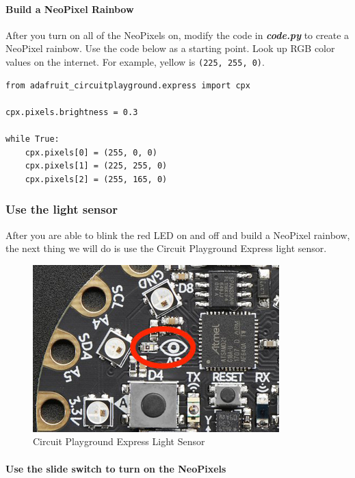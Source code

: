\documentclass[11pt]{article}
\makeatletter
\def\maxwidth{\ifdim\Gin@nat@width>\linewidth\linewidth
    \else\Gin@nat@width\fi}
\let\Oldincludegraphics\includegraphics
\renewcommand{\includegraphics}[1]{\Oldincludegraphics[width=.8\maxwidth]{#1}}
\makeatother
\begin{document}
\hypertarget{build-a-neopixel-rainbow}{%
\paragraph{Build a NeoPixel Rainbow}\label{build-a-neopixel-rainbow}}

After you turn on all of the NeoPixels on, modify the code in
\textbf{\emph{code.py}} to create a NeoPixel rainbow. Use the code below
as a starting point. Look up RGB color values on the internet. For
example, yellow is \texttt{(225,\ 255,\ 0)}.

\begin{verbatim}
from adafruit_circuitplayground.express import cpx

cpx.pixels.brightness = 0.3

while True:
    cpx.pixels[0] = (255, 0, 0)
    cpx.pixels[1] = (225, 255, 0)
    cpx.pixels[2] = (255, 165, 0) 
\end{verbatim}

    \hypertarget{use-the-light-sensor}{%
\subsubsection{Use the light sensor}\label{use-the-light-sensor}}

After you are able to blink the red LED on and off and build a NeoPixel
rainbow, the next thing we will do is use the Circuit Playground Express
light sensor.

\begin{figure}
\centering
\includegraphics{images/circuitpython_cpx_light_sensor.jpg}
\caption{Circuit Playground Express Light Sensor}
\end{figure}

\hypertarget{use-the-slide-switch-to-turn-on-the-neopixels}{%
\paragraph{Use the slide switch to turn on the
NeoPixels}\label{use-the-slide-switch-to-turn-on-the-neopixels}}
\end{document}
